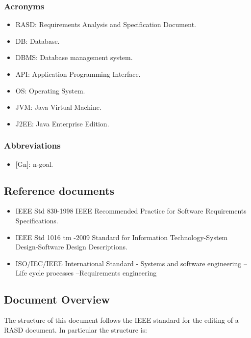\documentclass[english]{article}
\begin{document}
\subsubsection{Acronyms}
\begin{itemize} 
	\item RASD: Requirements Analysis and Specification Document.
	\item DB: Database.
	\item DBMS: Database management system.
	\item API: Application Programming Interface.
	\item OS: Operating System.
	\item JVM: Java Virtual Machine.
	\item J2EE: Java Enterprise Edition.
\end{itemize}

\subsubsection{Abbreviations}
\begin{itemize}
	\item {[}Gn{]}: n-goal.
\end{itemize}


\subsection{Reference documents}
\begin{itemize}
	\item IEEE Std 830-1998 IEEE Recommended Practice for Software Requirements Specifications.
	\item IEEE Std 1016 tm -2009 Standard for Information Technology-System Design-Software Design Descriptions.
	\item ISO/IEC/IEEE International Standard - Systems and software engineering -- Life cycle processes --Requirements engineering
\end{itemize}

\subsection{Document Overview}
The structure of this document follows the IEEE standard for the editing of a RASD document. In particular the structure is:
\end{document}
